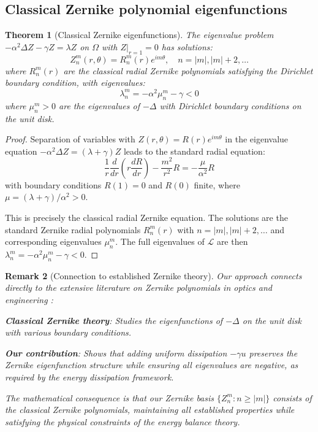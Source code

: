 \documentclass[a4paper,12pt]{article}
\newtheorem{theorem}{Theorem}[section]
\newtheorem{remark}[theorem]{Remark}
\begin{document}
\subsection{Classical Zernike polynomial eigenfunctions}

\begin{theorem}[Classical Zernike eigenfunctions]\label{thm:zernike_eigen}
The eigenvalue problem $-\alpha^2 \Delta Z - \gamma Z = \lambda Z$ on $\Omega$ with $Z|_{r=1}=0$ has solutions:
\begin{equation}
Z_n^m(r,\theta) = R_n^m(r) e^{im\theta}, \quad n = |m|, |m|+2, \ldots
\end{equation}
where $R_n^m(r)$ are the classical radial Zernike polynomials satisfying the Dirichlet boundary condition, with eigenvalues:
\begin{equation}
\lambda_n^m = -\alpha^2 \mu_n^m - \gamma < 0
\end{equation}
where $\mu_n^m > 0$ are the eigenvalues of $-\Delta$ with Dirichlet boundary conditions on the unit disk.
\end{theorem}

\begin{proof}
Separation of variables with $Z(r,\theta) = R(r)e^{im\theta}$ in the eigenvalue equation $-\alpha^2 \Delta Z = (\lambda + \gamma) Z$ leads to the standard radial equation:
\begin{equation}\label{eq:radial_zernike}
\frac{1}{r}\frac{d}{dr}\left(r\frac{dR}{dr}\right) - \frac{m^2}{r^2}R = -\frac{\mu}{\alpha^2}R
\end{equation}
with boundary conditions $R(1) = 0$ and $R(0)$ finite, where $\mu = (\lambda + \gamma)/\alpha^2 > 0$.

This is precisely the classical radial Zernike equation. The solutions are the standard Zernike radial polynomials $R_n^m(r)$ with $n = |m|, |m|+2, \ldots$ and corresponding eigenvalues $\mu_n^m$. The full eigenvalues of $\mathcal{L}$ are then $\lambda_n^m = -\alpha^2 \mu_n^m - \gamma < 0$.
\end{proof}

\begin{remark}[Connection to established Zernike theory]\label{rem:zernike_context}
Our approach connects directly to the extensive literature on Zernike polynomials in optics and engineering \citep{BornWolf,Mahajan1994,Janssen2014}:

\textbf{Classical Zernike theory}: Studies the eigenfunctions of $-\Delta$ on the unit disk with various boundary conditions.

\textbf{Our contribution}: Shows that adding uniform dissipation $-\gamma u$ preserves the Zernike eigenfunction structure while ensuring all eigenvalues are negative, as required by the energy dissipation framework.

The mathematical consequence is that our Zernike basis $\{Z_n^m : n \geq |m|\}$ consists of the classical Zernike polynomials, maintaining all established properties while satisfying the physical constraints of the energy balance theory.
\end{remark}
\end{document}
